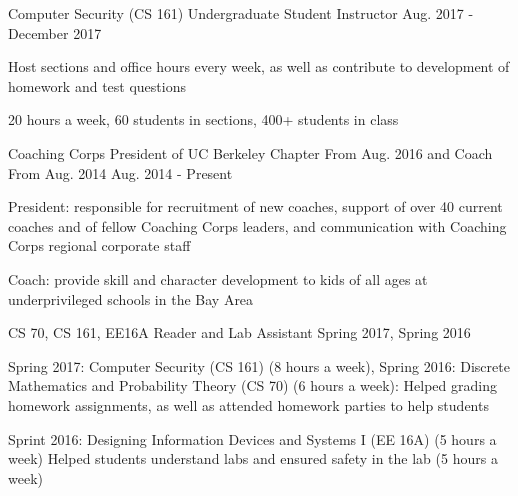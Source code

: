 \vspace{-4mm}
\vspace{-2mm}


\begin{cventries}

  \cventry
    {Computer Security (CS 161)} %
    {Undergraduate Student Instructor} %
    {Aug. 2017 - December 2017} %
    {} %
    {
      \begin{cvitems} %
        \item {Host sections and office hours every week, as well as contribute to development of homework and test questions}
        \item {20 hours a week, 60 students in sections, 400+ students in class}
      \end{cvitems}
    }
 
  \cventry
    {Coaching Corps} %
    {President of UC Berkeley Chapter From Aug. 2016 and Coach From Aug. 2014} %
    {Aug. 2014 - Present} %
    {} %
    {
      \begin{cvitems} %
        \item {President: responsible for recruitment of new coaches, support of over 40 current coaches and of fellow Coaching Corps leaders, and communication with Coaching Corps regional corporate staff}
        \item {Coach: provide skill and character development to kids of all ages at underprivileged schools in the Bay Area}
      \end{cvitems}
    }
  \cventry
    {CS 70, CS 161, EE16A} %
    {Reader and Lab Assistant} %
    {Spring 2017, Spring 2016} %
    {} %
    {
      \begin{cvitems} %
        \item {Spring 2017: Computer Security (CS 161) (8 hours a week), Spring 2016: Discrete Mathematics and Probability Theory (CS 70) (6 hours a week): Helped grading homework assignments, as well as attended homework parties to help students}
         \item {Sprint 2016: Designing Information Devices and Systems I (EE 16A) (5 hours a week) Helped students understand labs and ensured safety in the lab (5 hours a week)}
      \end{cvitems}
    }


\end{cventries}

